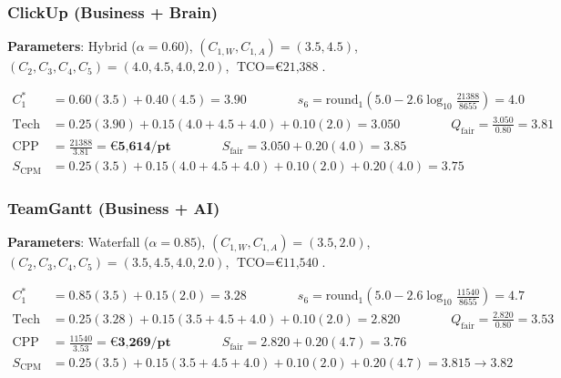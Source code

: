 \subsubsection{ClickUp (Business + Brain)}
\textbf{Parameters}: Hybrid ($\alpha = 0.60$), $(C_{1,W}, C_{1,A}) = (3.5, 4.5)$, $(C_2, C_3, C_4, C_5) = (4.0, 4.5, 4.0, 2.0)$, $\text{TCO} = \text{€21,388}$.
\begin{small}
\begin{align*}
    C_1^* &= 0.60(3.5) + 0.40(4.5) = \mathbf{3.90} \qquad \qquad
    s_6 = \text{round}_1\!\left(5.0 - 2.6\log_{10}\!\tfrac{21388}{8655}\right) = \mathbf{4.0} \\
    \text{Tech} &= 0.25(3.90) + 0.15(4.0 + 4.5 + 4.0) + 0.10(2.0) = 3.050 \qquad \qquad
    Q_{\text{fair}} = \tfrac{3.050}{0.80} = \mathbf{3.81} \\
    \text{CPP} &= \tfrac{21388}{3.81} = \mathbf{\text{€5,614/pt}} \qquad \qquad
    S_{\text{fair}} = 3.050 + 0.20(4.0) = \mathbf{3.85} \\
    S_{\text{CPM}} &= 0.25(3.5) + 0.15(4.0 + 4.5 + 4.0) + 0.10(2.0) + 0.20(4.0) = \mathbf{3.75}
\end{align*}
\end{small}

\subsubsection{TeamGantt (Business + AI)}
\textbf{Parameters}: Waterfall ($\alpha = 0.85$), $(C_{1,W}, C_{1,A}) = (3.5, 2.0)$,\\ $(C_2, C_3, C_4, C_5) = (3.5, 4.5, 4.0, 2.0)$, $\text{TCO} = \text{€11,540}$.
\begin{small}
\begin{align*}
    C_1^* &= 0.85(3.5) + 0.15(2.0) = \mathbf{3.28} \qquad \qquad
    s_6 = \text{round}_1\!\left(5.0 - 2.6\log_{10}\!\tfrac{11540}{8655}\right) = \mathbf{4.7} \\
    \text{Tech} &= 0.25(3.28) + 0.15(3.5 + 4.5 + 4.0) + 0.10(2.0) = 2.820 \qquad \qquad
    Q_{\text{fair}} = \tfrac{2.820}{0.80} = \mathbf{3.53} \\
    \text{CPP} &= \tfrac{11540}{3.53} = \mathbf{\text{€3,269/pt}} \qquad \qquad
    S_{\text{fair}} = 2.820 + 0.20(4.7) = \mathbf{3.76} \\
    S_{\text{CPM}} &= 0.25(3.5) + 0.15(3.5 + 4.5 + 4.0) + 0.10(2.0) + 0.20(4.7) = 3.815 \to \mathbf{3.82}
\end{align*}
\end{small}

